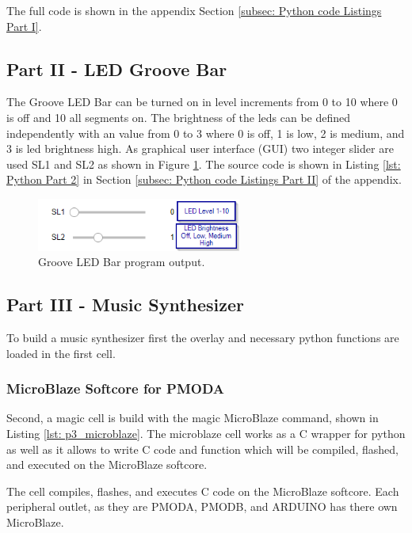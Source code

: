 The full code is shown in the appendix Section \ref{subsec: Python code Listings Part I}.

\subsection{Part II - LED Groove Bar}\label{subsec: Part II - LED Groove Bar}
The Groove LED Bar can be turned on in level increments from 0 to 10 where 0 is off and 10 all segments on. The brightness of the leds can be defined independently with an value from 0 to 3 where 0 is off, 1 is low, 2 is medium, and 3 is led brightness high. As graphical user interface (GUI) two integer slider are used SL1 and SL2 as shown in Figure \ref{fig: part2_output}. The source code is shown in Listing \ref{lst: Python Part 2} in Section \ref{subsec: Python code Listings Part II} of the appendix.

	\begin{figure}[H]
	\centering
	\includegraphics[width=0.6\textwidth]{01_images/p2_gui}
	\caption{Groove LED Bar program output.}
	\label{fig: part2_output}
	\end{figure}

\subsection{Part III - Music Synthesizer}\label{subsec: Part III - Music Synthesizer}

To build a music synthesizer first the overlay and necessary python functions are loaded in the first cell. 

\subsubsection{MicroBlaze Softcore for PMODA} 
Second, a magic cell is build with the magic MicroBlaze command, shown in Listing \ref{lst: p3_microblaze}. The microblaze cell works as a C wrapper for python as well as it allows to write C code and function which will be compiled, flashed, and executed on the MicroBlaze softcore.

The cell compiles, flashes, and executes C code on the MicroBlaze softcore. Each peripheral outlet, as they are PMODA, PMODB, and ARDUINO has there own MicroBlaze.

